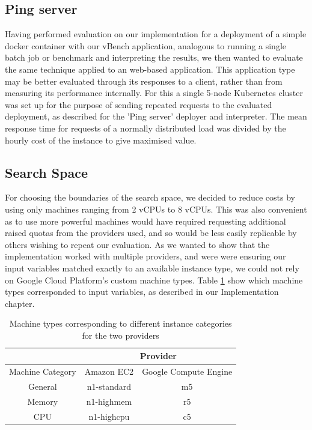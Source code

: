 \documentclass{report}
\begin{document}
\subsection{Ping server}
Having performed evaluation on our implementation for a deployment of a simple docker container with our vBench application, analogous to running a single batch job or benchmark and interpreting the results, we then wanted to evaluate the same technique applied to an web-based application. This application type may be better evaluated through its responses to a client, rather than from measuring its performance internally. For this a single 5-node Kubernetes cluster was set up for the purpose of sending repeated requests to the evaluated deployment, as described for the 'Ping server' deployer and interpreter. The mean response time for requests of a normally distributed load was divided by the hourly cost of the instance to give maximised value. 

\subsection{Search Space}
For choosing the boundaries of the search space, we decided to reduce costs by using only machines ranging from 2 vCPUs to 8 vCPUs. This was also convenient as to use more powerful machines would have required requesting additional raised quotas from the providers used, and so would be less easily replicable by others wishing to repeat our evaluation. As we wanted to show that the implementation worked with multiple providers, and were were ensuring our input variables matched exactly to an available instance type, we could not rely on Google Cloud Platform's custom machine types. Table \ref{tab:instance-types} show which machine types corresponded to input variables, as described in our Implementation chapter. 

\begin{table}[!ht]
\centering
\begin{tabular}{ |c||c|c|  }
 \hline
 & \multicolumn{2}{|c|}{Provider} \\
 \hline
 Machine Category & Amazon EC2 & Google Compute Engine \\
 \hline
 General& n1-standard & m5\\
 Memory & n1-highmem  & r5\\
 CPU    & n1-highcpu  & c5\\
 \hline
\end{tabular}
\caption{Machine types corresponding to different instance categories for the two providers}
\label{tab:instance-types}
\end{table}
\end{document}
